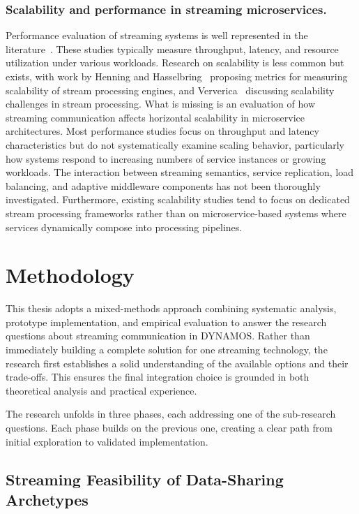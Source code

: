 \documentclass[a4paper,10pt,british]{scrartcl}
\begin{document}
\subsubsection{Scalability and performance in streaming microservices.} 
Performance evaluation of streaming systems is well represented in the literature~\cite{karimov2018benchmarking, vogel2024faultRecovery, systematicstreaming, sodankoor2026grpcbench, lote2022realtime}. These studies typically measure throughput, latency, and resource utilization under various workloads. Research on scalability is less common but exists, with work by Henning and Hasselbring~\cite{Henning2021ScalabilityMetrics} proposing metrics for measuring scalability of stream processing engines, and Ververica~\cite{ververica2023scalability} discussing scalability challenges in stream processing. What is missing is an evaluation of how streaming communication affects horizontal scalability in microservice architectures. Most performance studies focus on throughput and latency characteristics but do not systematically examine scaling behavior, particularly how systems respond to increasing numbers of service instances or growing workloads. The interaction between streaming semantics, service replication, load balancing, and adaptive middleware components has not been thoroughly investigated. Furthermore, existing scalability studies tend to focus on dedicated stream processing frameworks rather than on microservice-based systems where services dynamically compose into processing pipelines.

\section{Methodology}

This thesis adopts a mixed-methods approach combining systematic analysis, prototype implementation, and empirical evaluation to answer the research questions about streaming communication in DYNAMOS. Rather than immediately building a complete solution for one streaming technology, the research first establishes a solid understanding of the available options and their trade-offs. This ensures the final integration choice is grounded in both theoretical analysis and practical experience.

The research unfolds in three phases, each addressing one of the sub-research questions. Each phase builds on the previous one, creating a clear path from initial exploration to validated implementation.

\subsection{Streaming Feasibility of Data-Sharing Archetypes}
\end{document}

